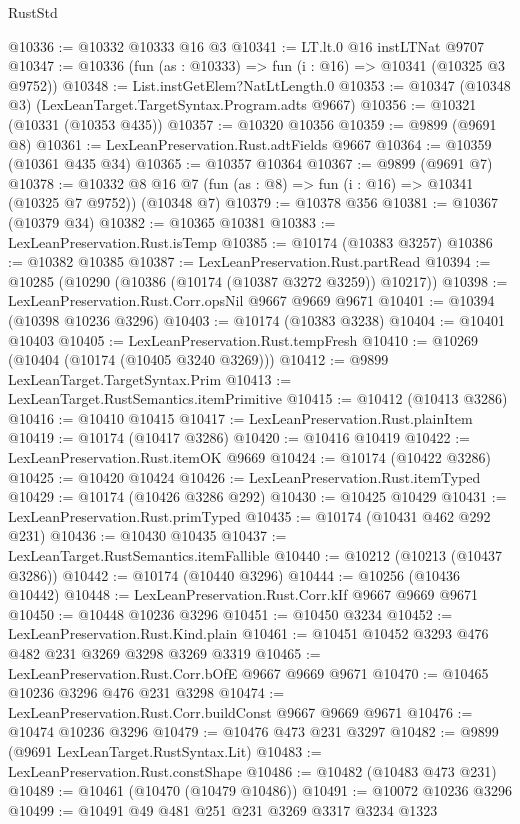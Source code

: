 \begin{lexlean}{RustStd}
\begin{coremodule}
@10336 := @10332 @10333 @16 @3
@10341 := LT.lt.{0} @16 instLTNat @9707
@10347 := @10336 (fun (as : @10333) => fun (i : @16) => @10341 (@10325 @3 @9752))
@10348 := List.instGetElem?NatLtLength.{0}
@10353 := @10347 (@10348 @3) (LexLeanTarget.TargetSyntax.Program.adts @9667)
@10356 := @10321 (@10331 (@10353 @435))
@10357 := @10320 @10356
@10359 := @9899 (@9691 @8)
@10361 := LexLeanPreservation.Rust.adtFields @9667
@10364 := @10359 (@10361 @435 @34)
@10365 := @10357 @10364
@10367 := @9899 (@9691 @7)
@10378 := @10332 @8 @16 @7 (fun (as : @8) => fun (i : @16) => @10341 (@10325 @7 @9752)) (@10348 @7)
@10379 := @10378 @356
@10381 := @10367 (@10379 @34)
@10382 := @10365 @10381
@10383 := LexLeanPreservation.Rust.isTemp
@10385 := @10174 (@10383 @3257)
@10386 := @10382 @10385
@10387 := LexLeanPreservation.Rust.partRead
@10394 := @10285 (@10290 (@10386 (@10174 (@10387 @3272 @3259)) @10217))
@10398 := LexLeanPreservation.Rust.Corr.opsNil @9667 @9669 @9671
@10401 := @10394 (@10398 @10236 @3296)
@10403 := @10174 (@10383 @3238)
@10404 := @10401 @10403
@10405 := LexLeanPreservation.Rust.tempFresh
@10410 := @10269 (@10404 (@10174 (@10405 @3240 @3269)))
@10412 := @9899 LexLeanTarget.TargetSyntax.Prim
@10413 := LexLeanTarget.RustSemantics.itemPrimitive
@10415 := @10412 (@10413 @3286)
@10416 := @10410 @10415
@10417 := LexLeanPreservation.Rust.plainItem
@10419 := @10174 (@10417 @3286)
@10420 := @10416 @10419
@10422 := LexLeanPreservation.Rust.itemOK @9669
@10424 := @10174 (@10422 @3286)
@10425 := @10420 @10424
@10426 := LexLeanPreservation.Rust.itemTyped
@10429 := @10174 (@10426 @3286 @292)
@10430 := @10425 @10429
@10431 := LexLeanPreservation.Rust.primTyped
@10435 := @10174 (@10431 @462 @292 @231)
@10436 := @10430 @10435
@10437 := LexLeanTarget.RustSemantics.itemFallible
@10440 := @10212 (@10213 (@10437 @3286))
@10442 := @10174 (@10440 @3296)
@10444 := @10256 (@10436 @10442)
@10448 := LexLeanPreservation.Rust.Corr.kIf @9667 @9669 @9671
@10450 := @10448 @10236 @3296
@10451 := @10450 @3234
@10452 := LexLeanPreservation.Rust.Kind.plain
@10461 := @10451 @10452 @3293 @476 @482 @231 @3269 @3298 @3269 @3319
@10465 := LexLeanPreservation.Rust.Corr.bOfE @9667 @9669 @9671
@10470 := @10465 @10236 @3296 @476 @231 @3298
@10474 := LexLeanPreservation.Rust.Corr.buildConst @9667 @9669 @9671
@10476 := @10474 @10236 @3296
@10479 := @10476 @473 @231 @3297
@10482 := @9899 (@9691 LexLeanTarget.RustSyntax.Lit)
@10483 := LexLeanPreservation.Rust.constShape
@10486 := @10482 (@10483 @473 @231)
@10489 := @10461 (@10470 (@10479 @10486))
@10491 := @10072 @10236 @3296
@10499 := @10491 @49 @481 @251 @231 @3269 @3317 @3234 @1323

\end{coremodule}
\end{lexlean}
